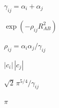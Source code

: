 \documentclass{article}
\begin{document}
$\gamma_{ij} = \alpha_i + \alpha_j$
\pagebreak

$\exp(-\rho_{ij} R_{AB}^2)$
\pagebreak

$\rho_{ij} = \alpha_i \alpha_j / \gamma_{ij}$
\pagebreak

$|c_i|\,|c_j|$
\pagebreak

$\sqrt{2}\,\pi^{5/4} / \gamma_{ij}$
\pagebreak

$\pi$
\pagebreak
\end{document}
